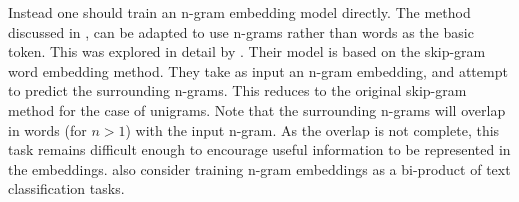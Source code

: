 {%


Instead one should train an n-gram embedding model directly.
The method discussed in , can be adapted to use n-grams rather than words as the basic token.
This was explored in detail by .
Their model is based on the skip-gram word embedding method.
They take as input an n-gram embedding, and attempt to predict the surrounding n-grams.
This reduces to the original skip-gram method for the case of unigrams.
Note that the surrounding n-grams will overlap in words (for $n>1$)  with the input n-gram.
As the overlap is not complete, this task remains difficult enough to encourage useful information to be represented in the embeddings.
\textcite{li2017neural} also consider training n-gram embeddings as a bi-product of text classification tasks.



}
